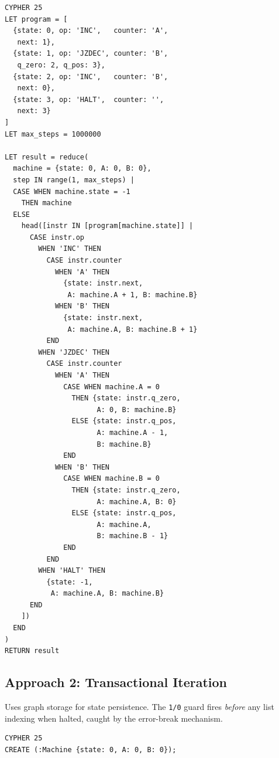 \documentclass[sigconf, anonymous, review, nonacm]{acmart}
\begin{document}
\begin{codeblock}
\begin{lstlisting}[style=cypher]
CYPHER 25
LET program = [
  {state: 0, op: 'INC',   counter: 'A',
   next: 1},
  {state: 1, op: 'JZDEC', counter: 'B',
   q_zero: 2, q_pos: 3},
  {state: 2, op: 'INC',   counter: 'B',
   next: 0},
  {state: 3, op: 'HALT',  counter: '',
   next: 3}
]
LET max_steps = 1000000

LET result = reduce(
  machine = {state: 0, A: 0, B: 0},
  step IN range(1, max_steps) |
  CASE WHEN machine.state = -1
    THEN machine
  ELSE
    head([instr IN [program[machine.state]] |
      CASE instr.op
        WHEN 'INC' THEN
          CASE instr.counter
            WHEN 'A' THEN
              {state: instr.next,
               A: machine.A + 1, B: machine.B}
            WHEN 'B' THEN
              {state: instr.next,
               A: machine.A, B: machine.B + 1}
          END
        WHEN 'JZDEC' THEN
          CASE instr.counter
            WHEN 'A' THEN
              CASE WHEN machine.A = 0
                THEN {state: instr.q_zero,
                      A: 0, B: machine.B}
                ELSE {state: instr.q_pos,
                      A: machine.A - 1,
                      B: machine.B}
              END
            WHEN 'B' THEN
              CASE WHEN machine.B = 0
                THEN {state: instr.q_zero,
                      A: machine.A, B: 0}
                ELSE {state: instr.q_pos,
                      A: machine.A,
                      B: machine.B - 1}
              END
          END
        WHEN 'HALT' THEN
          {state: -1,
           A: machine.A, B: machine.B}
      END
    ])
  END
)
RETURN result
\end{lstlisting}
\end{codeblock}

\subsection{Approach 2: Transactional Iteration}

Uses graph storage for state persistence.
The \texttt{1/0} guard fires \emph{before} any list indexing when
halted, caught by the error-break mechanism.

\begin{codeblock}
\begin{lstlisting}[style=cypher]
CYPHER 25
CREATE (:Machine {state: 0, A: 0, B: 0});
\end{lstlisting}
\end{codeblock}
\end{document}
